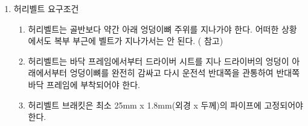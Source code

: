 \documentclass[final,a4paper,10pt]{report}
\begin{document}
\begin{enumerate}
\begin{enumerate}
        \item\label{rule:formula-technical.safety-belt.belt-mounting.wrap-around-tube-dimensions} {\color{blue} 파이프에 직접 감아 사용하는 경우 벨트를 감는 파이프는 외경 25mm, 두께 1.8mm 이상의 파이프를 사용하여야 하며, 좌우로 움직이지 않게 하여야 한다.}
        \item\label{rule:formula-technical.safety-belt.belt-mounting.belt-bolt-diameter-grade} 허리벨트 및 어깨벨트 고정을 위해 사용하는 볼트는 직경 8mm 이상, 강도 8.8 이상을 사용해야 한다.
        \item\label{rule:formula-technical.safety-belt.belt-mounting.eye-bolt-min-grade} 강도 8.8 미만의 아이볼트 사용을 금지한다.
        \item\label{rule:formula-technical.safety-belt.belt-mounting.no-welded-fasteners} 안전벨트 고정을 위하여 볼트(아이볼트/아이너트) 또는 너트를 용접하여 사용하는 것은 금지한다.
        \item\label{rule:formula-technical.safety-belt.belt-mounting.monocoque-equivalency-submission} 모노코크 구조의 경우는 \ref{section:안전 구조 대응물}에 제시된 구조 대응물 양식을 제출한다. \label{item:모노코크 안전벨트 접합부}
        \item\label{rule:formula-technical.safety-belt.belt-mounting.cockpit-side-of-firewall} 벨트는 방화벽을 기준으로 운전석 쪽에 위치해야 한다.
        \item\label{rule:formula-technical.safety-belt.belt-mounting.tension-and-shear-capacity} 벨트 브라켓과 볼트는 아래와 같이 인장하중 및 전단하중을 견딜 수 있도록 설치하여야 한다. ( 참고)

      \end{enumerate}
    \item\label{rule:formula-technical.safety-belt.lap-belt} 허리벨트 요구조건
      \begin{enumerate}
        \item\label{rule:formula-technical.safety-belt.lap-belt.pelvis-routing-not-abdomen} 허리벨트는 골반보다 약간 아래 엉덩이뼈 주위를 지나가야 한다. 어떠한 상황에서도 복부 부근에 벨트가 지나가서는 안 된다. ( 참고)
        \item\label{rule:formula-technical.safety-belt.lap-belt.belt-path-across-cockpit} 허리벨트는 바닥 프레임에서부터 드라이버 시트를 지나 드라이버의 엉덩이 아래에서부터 엉덩이뼈를 완전히 감싸고 다시 운전석 반대쪽을 관통하여 반대쪽 바닥 프레임에 부착되어야 한다.
        \item\label{rule:formula-technical.safety-belt.lap-belt.bracket-min-tube-size} 허리벨트 브래킷은 최소 25mm x 1.8mm(외경 x 두께)의 파이프에 고정되어야 한다.


\end{enumerate}
\end{enumerate}
\end{document}
